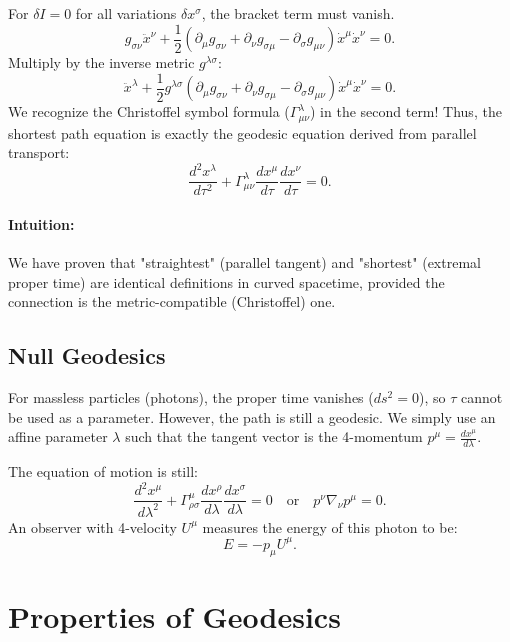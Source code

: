 \documentclass[11pt, a4paper]{report}
\begin{document}
For \(\delta I = 0\) for all variations \(\delta x^\sigma\), the bracket term must vanish.
\begin{equation}
g_{\sigma\nu} \ddot{x}^\nu + \frac{1}{2} \left( \partial_\mu g_{\sigma\nu} + \partial_\nu g_{\sigma\mu} - \partial_\sigma g_{\mu\nu} \right) \dot{x}^\mu \dot{x}^\nu = 0.
\end{equation}
Multiply by the inverse metric \(g^{\lambda\sigma}\):
\begin{equation}
\ddot{x}^\lambda + \frac{1}{2} g^{\lambda\sigma} ( \partial_\mu g_{\sigma\nu} + \partial_\nu g_{\sigma\mu} - \partial_\sigma g_{\mu\nu} ) \dot{x}^\mu \dot{x}^\nu = 0.
\end{equation}
We recognize the Christoffel symbol formula (\(\Gamma^\lambda_{\mu\nu}\)) in the second term! Thus, the shortest path equation is exactly the geodesic equation derived from parallel transport:
\begin{equation}
\frac{d^2 x^\lambda}{d\tau^2} + \Gamma^\lambda_{\mu\nu} \frac{dx^\mu}{d\tau} \frac{dx^\nu}{d\tau} = 0.
\end{equation}
\paragraph{Intuition:} We have proven that "straightest" (parallel tangent) and "shortest" (extremal proper time) are identical definitions in curved spacetime, provided the connection is the metric-compatible (Christoffel) one.

\subsection*{Null Geodesics}
For massless particles (photons), the proper time vanishes (\(ds^2 = 0\)), so \(\tau\) cannot be used as a parameter. However, the path is still a geodesic. We simply use an affine parameter \(\lambda\) such that the tangent vector is the 4-momentum \(p^\mu = \frac{dx^\mu}{d\lambda}\).

The equation of motion is still:
\begin{equation}
\frac{d^2 x^\mu}{d\lambda^2} + \Gamma^\mu_{\rho\sigma} \frac{dx^\rho}{d\lambda} \frac{dx^\sigma}{d\lambda} = 0 \quad \text{or} \quad p^\nu \nabla_\nu p^\mu = 0.
\end{equation}
An observer with 4-velocity \(U^\mu\) measures the energy of this photon to be:
\begin{equation}
E = - p_\mu U^\mu.
\end{equation}
\section{Properties of Geodesics}
\end{document}
